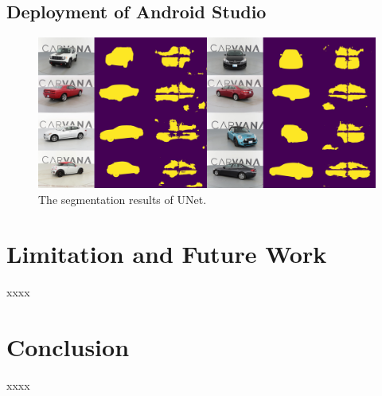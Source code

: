 \documentclass[conference]{IEEEtran}
\begin{document}
\subsection{Deployment of Android Studio}
	\begin{figure}[htbp]
	\centering
	\includegraphics[width=1\linewidth]{figures/mobile_seg.png}
	\caption{The segmentation results of UNet.}
\end{figure}


\section{Limitation and Future Work} 
xxxx

\section{Conclusion} 
xxxx

  

\end{document}
